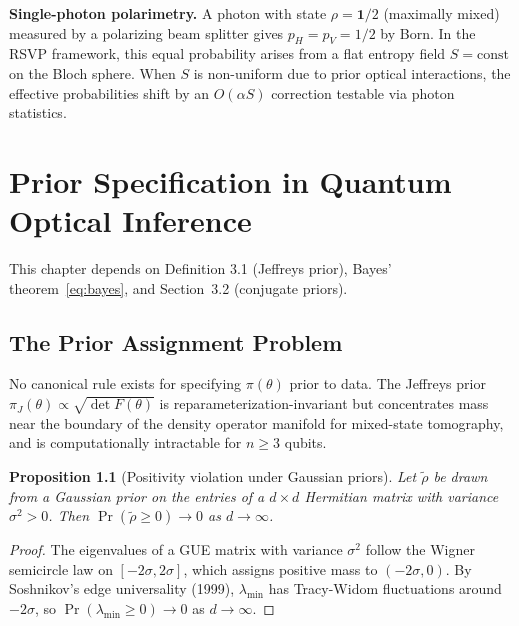 \documentclass[11pt, openright, twoside]{book}
\theoremstyle{plain}
\newtheorem{proposition}[theorem]{Proposition}
\theoremstyle{definition}
\theoremstyle{remark}
\newcommand{\Sfield}{S}
\begin{document}
\begin{exbox}
\textbf{Single-photon polarimetry.} A photon with state $\rho=\mathbf{1}/2$ (maximally
mixed) measured by a polarizing beam splitter gives $p_H=p_V=1/2$ by Born. In the RSVP
framework, this equal probability arises from a flat entropy field $\Sfield=\mathrm{const}$
on the Bloch sphere. When $\Sfield$ is non-uniform due to prior optical interactions, the
effective probabilities shift by an $O(\alpha\Sfield)$ correction testable via photon
statistics.
\end{exbox}

\chapter{Prior Specification in Quantum Optical Inference}

\begin{depbox}
This chapter depends on Definition 3.1 (Jeffreys prior), Bayes' theorem~\eqref{eq:bayes},
and Section~3.2 (conjugate priors).
\end{depbox}

\section{The Prior Assignment Problem}

No canonical rule exists for specifying $\pi(\theta)$ prior to data. The Jeffreys prior
$\pi_J(\theta)\propto\sqrt{\det F(\theta)}$ is reparameterization-invariant but concentrates
mass near the boundary of the density operator manifold for mixed-state tomography, and is
computationally intractable for $n\geq 3$ qubits.

\begin{proposition}[Positivity violation under Gaussian priors]
\label{prop:gaussian_failure}
Let $\tilde\rho$ be drawn from a Gaussian prior on the entries of a $d\times d$ Hermitian
matrix with variance $\sigma^2>0$. Then $\Pr(\tilde\rho\geq 0)\to 0$ as $d\to\infty$.
\end{proposition}

\begin{proof}
The eigenvalues of a GUE matrix with variance $\sigma^2$ follow the Wigner semicircle law
on $[-2\sigma,2\sigma]$, which assigns positive mass to $(-2\sigma,0)$. By Soshnikov's
edge universality (1999), $\lambda_{\min}$ has Tracy-Widom fluctuations around $-2\sigma$,
so $\Pr(\lambda_{\min}\geq 0)\to 0$ as $d\to\infty$.
\end{proof}
\end{document}

